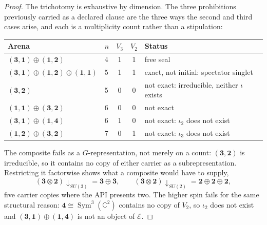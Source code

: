 \documentclass[11pt]{article}
\theoremstyle{plain}
\theoremstyle{definition}
\theoremstyle{remark}
\newcommand{\C}{\mathbb{C}}
\begin{document}
\begin{proof}
The trichotomy is exhaustive by dimension.  The three prohibitions previously
carried as a declared clause are the three ways the second and third cases
arise, and each is a multiplicity count rather than a stipulation:
\begin{center}
\small
\begin{tabular}{llccl}
\toprule
Arena & \(n\) & \(V_3\) & \(V_2\) & Status \\
\midrule
\((\mathbf3,\mathbf1)\oplus(\mathbf1,\mathbf2)\) & 4 & 1 & 1 & free seal \\
\((\mathbf3,\mathbf1)\oplus(\mathbf1,\mathbf2)\oplus(\mathbf1,\mathbf1)\) & 5 & 1 & 1 & exact, not initial: spectator singlet \\
\((\mathbf3,\mathbf2)\) & 5 & 0 & 0 & not exact: irreducible, neither \(\iota\) exists \\
\((\mathbf1,\mathbf1)\oplus(\mathbf3,\mathbf2)\) & 6 & 0 & 0 & not exact \\
\((\mathbf3,\mathbf1)\oplus(\mathbf1,\mathbf4)\) & 6 & 1 & 0 & not exact: \(\iota_2\) does not exist \\
\((\mathbf1,\mathbf2)\oplus(\mathbf3,\mathbf2)\) & 7 & 0 & 1 & not exact: \(\iota_3\) does not exist \\
\bottomrule
\end{tabular}
\end{center}
The composite fails as a \(G\)-representation, not merely on a count: \((\mathbf3,\mathbf2)\)
is irreducible, so it contains no copy of either carrier as a subrepresentation.
Restricting it factorwise shows what a composite would have to supply,
\[
(\mathbf3\otimes\mathbf2)\!\downarrow_{SU(3)}=\mathbf3\oplus\mathbf3,
\qquad
(\mathbf3\otimes\mathbf2)\!\downarrow_{SU(2)}=\mathbf2\oplus\mathbf2\oplus\mathbf2,
\]
five carrier copies where the API presents two.  The higher spin fails for the
same structural reason: \(\mathbf4\cong\operatorname{Sym}^3(\C^2)\) contains no
copy of \(V_2\), so \(\iota_2\) does not exist and
\((\mathbf3,\mathbf1)\oplus(\mathbf1,\mathbf4)\) is not an object of
\(\mathcal E\).  \qedhere
\end{proof}
\end{document}
